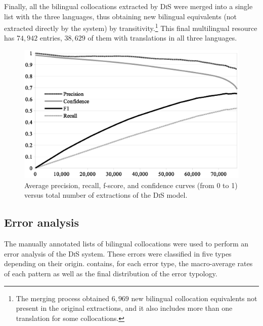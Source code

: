 \documentclass[output=paper,modfonts,nonflat]{langsci/langscibook}
\begin{document}
Finally, all the bilingual collocations extracted by \textsc{DiS} were merged
into a single list with the three languages, thus obtaining new bilingual
equivalents (not extracted directly by the system) by transitivity.\footnote{The merging process
  obtained $6,969$ new bilingual collocation equivalents not present in the original extractions, and it also
  includes more than one translation for some collocations.}
This final multilingual resource has $74,942$ entries, $38,629$ of them with translations in all three languages.

\begin{figure}
  \centering
  \includegraphics[width=\textwidth]{figures/curve.eps}
  \caption{\label{fig:curva}Average precision, recall, f-score, and confidence
    curves (from 0 to 1) versus total number of extractions of the \textsc{DiS} model.}
\end{figure}

%
\subsection{Error analysis}
\label{garcia:sec:error}
The manually annotated lists of bilingual collocations were used to perform an error analysis
of the \textsc{DiS} system. These errors were classified in five types depending on
their origin.  contains, for each error type, the macro-average rates
of each  pattern as well as the final distribution of the error typology.
\end{document}
